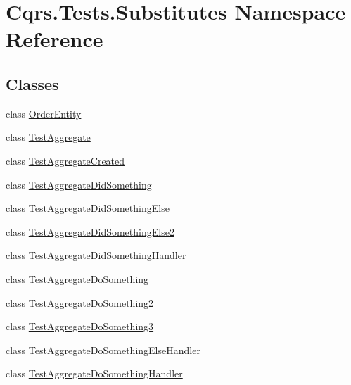 \hypertarget{namespaceCqrs_1_1Tests_1_1Substitutes}{}\section{Cqrs.\+Tests.\+Substitutes Namespace Reference}
\label{namespaceCqrs_1_1Tests_1_1Substitutes}
\subsection*{Classes}
\begin{DoxyCompactItemize}
\item 
class \hyperlink{classCqrs_1_1Tests_1_1Substitutes_1_1OrderEntity}{Order\+Entity}
\item 
class \hyperlink{classCqrs_1_1Tests_1_1Substitutes_1_1TestAggregate}{Test\+Aggregate}
\item 
class \hyperlink{classCqrs_1_1Tests_1_1Substitutes_1_1TestAggregateCreated}{Test\+Aggregate\+Created}
\item 
class \hyperlink{classCqrs_1_1Tests_1_1Substitutes_1_1TestAggregateDidSomething}{Test\+Aggregate\+Did\+Something}
\item 
class \hyperlink{classCqrs_1_1Tests_1_1Substitutes_1_1TestAggregateDidSomethingElse}{Test\+Aggregate\+Did\+Something\+Else}
\item 
class \hyperlink{classCqrs_1_1Tests_1_1Substitutes_1_1TestAggregateDidSomethingElse2}{Test\+Aggregate\+Did\+Something\+Else2}
\item 
class \hyperlink{classCqrs_1_1Tests_1_1Substitutes_1_1TestAggregateDidSomethingHandler}{Test\+Aggregate\+Did\+Something\+Handler}
\item 
class \hyperlink{classCqrs_1_1Tests_1_1Substitutes_1_1TestAggregateDoSomething}{Test\+Aggregate\+Do\+Something}
\item 
class \hyperlink{classCqrs_1_1Tests_1_1Substitutes_1_1TestAggregateDoSomething2}{Test\+Aggregate\+Do\+Something2}
\item 
class \hyperlink{classCqrs_1_1Tests_1_1Substitutes_1_1TestAggregateDoSomething3}{Test\+Aggregate\+Do\+Something3}
\item 
class \hyperlink{classCqrs_1_1Tests_1_1Substitutes_1_1TestAggregateDoSomethingElseHandler}{Test\+Aggregate\+Do\+Something\+Else\+Handler}
\item 
class \hyperlink{classCqrs_1_1Tests_1_1Substitutes_1_1TestAggregateDoSomethingHandler}{Test\+Aggregate\+Do\+Something\+Handler}
\item 

\end{DoxyCompactItemize}
